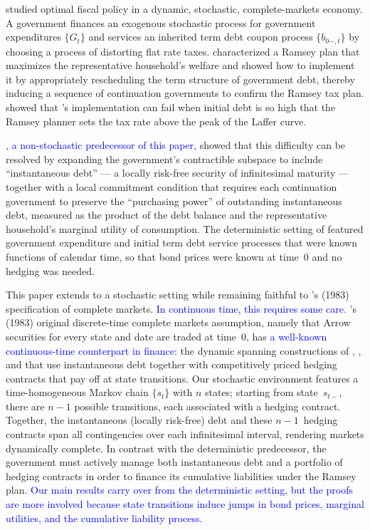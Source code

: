 \documentclass[12pt]{article}
\newcommand{\NW}[1]{{\textcolor{blue}{#1}}}
\begin{document}
\citet{LucasStokey1983} studied optimal fiscal policy in a dynamic, stochastic, complete-markets economy. A  government finances an exogenous stochastic process for government expenditures $\{G_t\}$ and services  an inherited term debt coupon process $\{b_{0-,t}\}$ by choosing a  process of distorting flat rate taxes. \citeauthor{LucasStokey1983} characterized a Ramsey plan that maximizes the representative household's welfare and showed how to implement it by appropriately rescheduling the  term structure of government debt, thereby inducing  a sequence of continuation governments  to confirm the Ramsey tax plan. \citet*{debortoli2021optimal} showed that \citeauthor{LucasStokey1983}'s implementation can fail when initial debt is so high that the Ramsey planner sets the tax rate above the peak of the Laffer curve.

\NW{\cite{JiangSargentWang2024}, a non-stochastic predecessor of this paper,}  showed  that this difficulty can be resolved by expanding the government's contractible subspace to include  ``instantaneous debt'' --- a locally risk-free security of infinitesimal maturity --- together with a local commitment condition that requires each continuation government to preserve the ``purchasing power'' of outstanding instantaneous debt, measured as the product of the debt balance  and the representative household's marginal utility of consumption.  The deterministic setting of \cite{JiangSargentWang2024} featured  government expenditure and initial term debt service processes that were known functions of calendar time, so  that  bond prices were known at time~$0$ and  no hedging was needed. 

This paper extends   \cite{JiangSargentWang2024} to a stochastic setting  while  remaining faithful to   \citeauthor{LucasStokey1983}'s (1983) specification of complete markets. \NW{In continuous time, this requires some care.} \citeauthor{LucasStokey1983}'s (1983) original discrete-time  complete markets assumption, namely  that Arrow securities for every   state and date  are traded at time~$0$, has \NW{a  well-known continuous-time counterpart in  finance:} the dynamic   spanning constructions  of \cite{BlackScholes1973}, \cite{merton1973theory}, and \cite{HarrisonandKreps1979} that use  instantaneous debt  together with  competitively priced hedging contracts that pay off at state transitions. Our stochastic environment features a time-homogeneous Markov chain $\{s_t\}$ with $n$ states; starting from state~$s_{t-}$, there are $n-1$ possible transitions,  each associated with a hedging contract. Together, the instantaneous (locally risk-free)  debt and these $n-1$~hedging contracts  span all contingencies  over each infinitesimal interval, rendering  markets dynamically complete.   In contrast with the deterministic predecessor, the government must  actively manage both instantaneous  debt and a portfolio of hedging contracts  in order to  finance its  cumulative liabilities under the Ramsey plan. \NW{Our  main  results carry over from the deterministic setting, but the proofs are   more involved because  state transitions induce jumps in bond prices, marginal utilities, and the cumulative liability process.
} 
\end{document}

